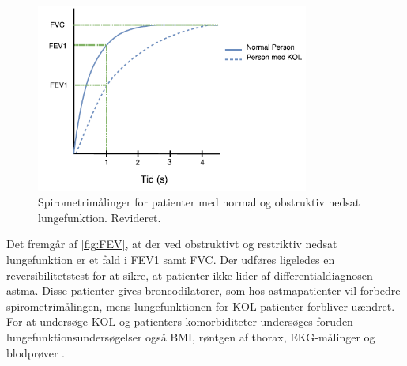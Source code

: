 \begin{figure} [H]
\centering
\includegraphics[width=0.8\textwidth]{figures/FEV}
\caption{Spirometrimålinger for patienter med normal og obstruktiv nedsat lungefunktion. Revideret\cite{Basisbogen2016}.}
\label{fig:FEV}
\end{figure} 

\noindent
Det fremgår af \autoref{fig:FEV}, at der ved obstruktivt og restriktiv nedsat lungefunktion er et fald i FEV1 samt FVC. Der udføres ligeledes en reversibilitetstest for at sikre, at patienter ikke lider af differentialdiagnosen astma. Disse patienter gives broncodilatorer, som hos astmapatienter vil forbedre spirometrimålingen, mens lungefunktionen for KOL-patienter forbliver uændret.\cite{Basisbogen2016, Sundhed2013} 
For at undersøge KOL og patienters komorbiditeter undersøges foruden lungefunktionsundersøgelser også BMI, røntgen af thorax, EKG-målinger og blodprøver \cite{Sundhed2013}. 
